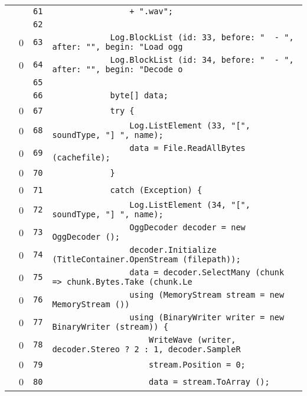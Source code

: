 \documentclass[a4paper,10pt]{article}
\begin{document}
\begin{longtable}[l]{lrrl}
\cellcolor{gray} &  & \verb~61~ & \verb~                + ".wav";~\\
\cellcolor{gray} &  & \verb~62~ & \verb~~\\
\cellcolor{red} & 0 & \verb~63~ & \verb~            Log.BlockList (id: 33, before: "  - ", after: "", begin: "Load ogg~\\
\cellcolor{red} & 0 & \verb~64~ & \verb~            Log.BlockList (id: 34, before: "  - ", after: "", begin: "Decode o~\\
\cellcolor{gray} &  & \verb~65~ & \verb~~\\
\cellcolor{gray} &  & \verb~66~ & \verb~            byte[] data;~\\
\cellcolor{red} & 0 & \verb~67~ & \verb~            try {~\\
\cellcolor{red} & 0 & \verb~68~ & \verb~                Log.ListElement (33, "[", soundType, "] ", name);~\\
\cellcolor{red} & 0 & \verb~69~ & \verb~                data = File.ReadAllBytes (cachefile);~\\
\cellcolor{red} & 0 & \verb~70~ & \verb~            }~\\
\cellcolor{red} & 0 & \verb~71~ & \verb~            catch (Exception) {~\\
\cellcolor{red} & 0 & \verb~72~ & \verb~                Log.ListElement (34, "[", soundType, "] ", name);~\\
\cellcolor{red} & 0 & \verb~73~ & \verb~                OggDecoder decoder = new OggDecoder ();~\\
\cellcolor{red} & 0 & \verb~74~ & \verb~                decoder.Initialize (TitleContainer.OpenStream (filepath));~\\
\cellcolor{red} & 0 & \verb~75~ & \verb~                data = decoder.SelectMany (chunk => chunk.Bytes.Take (chunk.Le~\\
\cellcolor{red} & 0 & \verb~76~ & \verb~                using (MemoryStream stream = new MemoryStream ())~\\
\cellcolor{red} & 0 & \verb~77~ & \verb~                using (BinaryWriter writer = new BinaryWriter (stream)) {~\\
\cellcolor{red} & 0 & \verb~78~ & \verb~                    WriteWave (writer, decoder.Stereo ? 2 : 1, decoder.SampleR~\\
\cellcolor{red} & 0 & \verb~79~ & \verb~                    stream.Position = 0;~\\
\cellcolor{red} & 0 & \verb~80~ & \verb~                    data = stream.ToArray ();~\\

\end{longtable}
\end{document}
